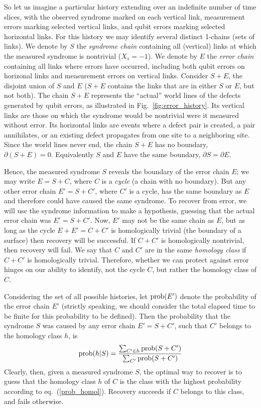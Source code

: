 So let us imagine a particular history extending over an indefinite number of time slices, with the observed syndrome marked on each vertical link, measurement errors marking selected vertical links, and qubit errors marking selected horizontal links. For this history we may identify several distinct 1-chains (sets of links). We denote by $S$ the {\em syndrome chain} containing all (vertical) links at which the measured syndrome is nontrivial ($X_s=-1$). We denote by $E$ the {\em error chain} containing all links where errors have occurred, including both qubit errors on horizonal links and measurement errors on vertical links. Consider $S+E$, the disjoint union of $S$ and $E$ ($S+E$ contains the links that are in either $S$ or $E$, but not both). The chain $S+E$  represents the ``actual'' world lines of the defects generated by qubit errors, as illustrated in Fig.~\ref{fig:error_history}. Its vertical links are those on which the syndrome would be nontrivial were it measured without error. Its horizontal links are events where a defect pair is created, a pair annihilates, or an existing defect propagates from one site to a neighboring site. Since the world lines never end, the chain $S+E$ has no boundary, $\partial(S+E)=0$. Equivalently $S$ and $E$ have the same boundary, $\partial S=\partial E$. 

Hence, the measured syndrome $S$ reveals the boundary of the error chain $E$; we may write $E=S+C$, where $C$ is a {\em cycle} (a chain with no boundary). But any other error chain $E'=S+C'$, where $C'$ is a cycle, has the same boundary as $E$ and therefore could have caused the same syndrome. To recover from error, we will use the syndrome information to make a hypothesis, guessing that the actual error chain was $E'=S+C'$. Now, $E'$ may not be the same chain as $E$, but as long as the cycle $E+E'=C+C'$ is homologically trivial (the boundary of a surface) then recovery will be successful. If $C+C'$ is homologically nontrivial, then recovery will fail. We say that $C$ and $C'$ are in the same {\em homology class} if $C+C'$ is homologically trivial. Therefore, whether we can protect against error hinges on our ability to identify, not the cycle $C$, but rather the homology class of $C$.

Considering the set of all possible histories, let ${\rm prob}(E')$ denote the probability of the error chain $E'$ (strictly speaking, we should consider the total elapsed time to be finite for this probability to be defined). Then the probability that the syndrome $S$ was caused by any error chain $E'=S+C'$, such that $C'$ belongs to the homology class $h$, is
\begin{equation}
{\rm prob}(h|S)={\sum_{C'\in h}{\rm prob}(S+C')\over \sum_{C'}{\rm prob}(S+C')}
\label{prob_homol}
\end{equation}
Clearly, then, given a measured syndrome $S$, the optimal way to recover is to guess that the homology class $h$ of $C$ is the class with the highest probability according to eq.~(\ref{prob_homol}). Recovery succeeds if $C$ belongs to this class, and fails otherwise.

